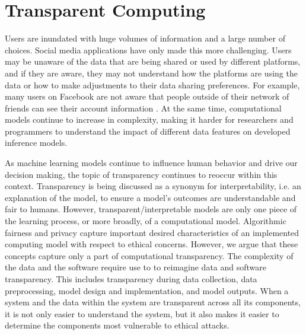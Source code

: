 \documentclass[11pt]{article} %
\begin{document}
\section{Transparent Computing}
\label{sec:transparency}
Users are inundated with huge volumes of information and a large number of choices. Social media applications have only made this more challenging. Users may be unaware of the data that are being shared or used by different platforms, and if they are aware, they may not understand how the platforms are using the data or how to make adjustments to their data sharing preferences. For example, many users on Facebook are not aware that people outside of their network of friends can see their account information \cite{orito_2014,FB_targetad}.
At the same time, computational models continue to increase in complexity, making it harder for researchers and programmers to understand the impact of different data features on developed inference models. 

As machine learning models continue to influence human behavior and drive our decision making, the topic of transparency continues to reoccur within this context. Transparency is being discussed as a synonym for interpretability, i.e. an explanation of the model, to ensure a model's outcomes are understandable and fair to humans. However, transparent/interpretable models are only one piece of the learning process, or more broadly, of a computational model. Algorithmic fairness and privacy capture important desired characteristics of an implemented computing model with respect to ethical concerns. However, we argue that these concepts capture only a part of computational transparency. The complexity of the data and the software require use to to reimagine data and software transparency. This includes transparency during data collection, data preprocessing, model design and implementation, and model outputs.  When a system and the data within the system are transparent across all its components, it is not only easier to understand the system, but it also makes it easier to determine the components most vulnerable to ethical attacks. 
\end{document}
